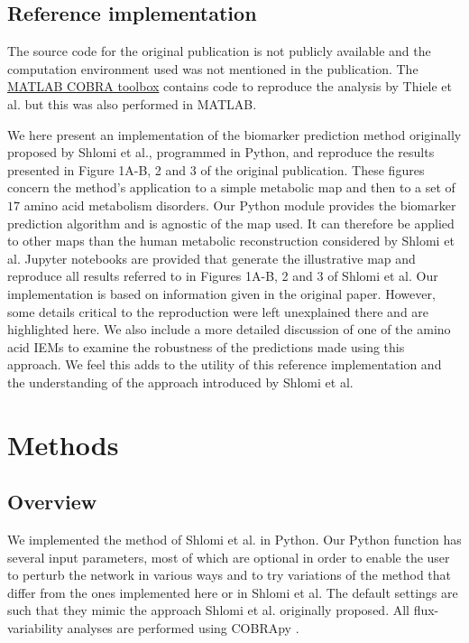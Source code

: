 \documentclass[10pt,a4paper,onecolumn]{article}
\begin{document}
\subsection{Reference implementation}\label{reference-implementation}

The source code for the original publication is not publicly available
and the computation environment used was not mentioned in the
publication. The \href{https://github.com/opencobra/cobratoolbox}{MATLAB
COBRA toolbox} contains code to reproduce the analysis by Thiele et al.
but this was also performed in MATLAB.

We here present an implementation of the biomarker prediction method
originally proposed by Shlomi et al., programmed in Python, and
reproduce the results presented in Figure 1A-B, 2 and 3 of the original
publication. These figures concern the method's application to a simple
metabolic map and then to a set of \(17\) amino acid metabolism
disorders. Our Python module provides the biomarker prediction algorithm
and is agnostic of the map used. It can therefore be applied to other
maps than the human metabolic reconstruction considered by Shlomi et al.
Jupyter notebooks are provided that generate the illustrative map and
reproduce all results referred to in Figures 1A-B, 2 and 3 of Shlomi et
al. Our implementation is based on information given in the original
paper. However, some details critical to the reproduction were left
unexplained there and are highlighted here. We also include a more
detailed discussion of one of the amino acid IEMs to examine the
robustness of the predictions made using this approach. We feel this
adds to the utility of this reference implementation and the
understanding of the approach introduced by Shlomi et al.

\section{Methods}\label{methods}

\subsection{Overview}\label{overview}

We implemented the method of Shlomi et al. in Python. Our Python
function has several input parameters, most of which are optional in
order to enable the user to perturb the network in various ways and to
try variations of the method that differ from the ones implemented here
or in Shlomi et al. The default settings are such that they mimic the
approach Shlomi et al. originally proposed. All flux-variability
analyses are performed using COBRApy \autocite{Ebrahim2013}.
\end{document}
